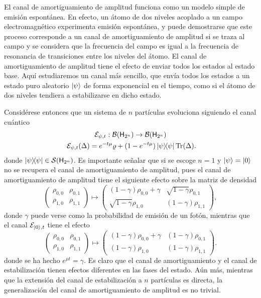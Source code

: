 El canal de amortiguamiento de amplitud funciona como un modelo simple de emisión espontánea. En efecto, un átomo de dos niveles acoplado a un campo electromagnético experimenta emisión espontánea, y puede demostrarse que este proceso corresponde a un canal de amortiguamiento de amplitud si se traza al campo y se considera que la frecuencia del campo es igual a la frecuencia de resonancia de transiciones entre los niveles del átomo. El canal de amortiguamiento de amplitud tiene el efecto de enviar todos los estados al estado base. Aquí estudiaremos un canal más sencillo, que envía todos los estados a un estado puro aleatorio $\ket{\psi}$ de forma exponencial en el tiempo, como si el átomo de dos niveles tendiera a estabilizarse en dicho estado.

Considérese entonces que un sistema de $n$ partículas evoluciona siguiendo el canal cuántico
\begin{gather}
    \mcE_{\psi,t}:\mcB(\hilbert_{2^{n}}) \rightarrow \mcB(\hilbert_{2^{n}})\nonumber\\
    \mcE_{\psi,t}(\Delta)=e^{-t\mu}\varrho+(1-e^{-t \mu})\dyad{\psi}\Tr(\Delta)\rlap{.}\nonumber
\end{gather}
donde $\dyad{\psi}\in \densityspace{2^{n}}$. Es importante señalar que si se escoge $n=1$ y $\ket{\psi}=\ket{0}$ no se recupera el canal de amortiguamiento de amplitud, pues el canal de amortiguamiento de amplitud tiene el siguiente efecto sobre la matriz de densidad
\begin{equation}
    \begin{pmatrix}
        \rho_{0,0} & \rho_{0,1} \\
        \rho_{1,0} & \rho_{1,1}
    \end{pmatrix}\mapsto\begin{pmatrix}
        (1-\gamma)\rho_{0,0}+\gamma & \sqrt{1-\gamma}\rho_{0,1} \\
        \sqrt{1-\gamma}\rho_{1,0} & (1-\gamma)\rho_{1,1}
    \end{pmatrix},\nonumber
\end{equation}
donde $\gamma$ puede verse como la probabilidad de emisión de un fotón, mientras que el canal $\mathcal{E}_{\ket{0},t}$ tiene el efecto
\begin{equation}
    \begin{pmatrix}
        \rho_{0,0} & \rho_{0,1} \\
        \rho_{1,0} & \rho_{1,1}
    \end{pmatrix}\mapsto\begin{pmatrix}
        (1-\gamma)\rho_{0,0}+\gamma & (1-\gamma)\rho_{0,1} \\
        (1-\gamma)\rho_{1,0} & (1-\gamma)\rho_{1,1}
    \end{pmatrix}.\nonumber
\end{equation}
donde se ha hecho $e^{\mu t}=\gamma$. Es claro que el canal de amortiguamiento y el canal de estabilización tienen efectos diferentes en las fases del estado. Aún más, mientras que la extensión del canal de estabilización a $n$ partículas es directa, la generalización del canal de amortiguamiento de amplitud es no trivial. 

